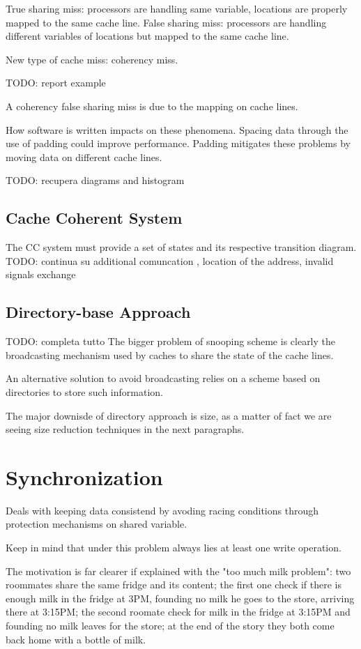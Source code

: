 True sharing miss: processors are handling same variable, locations are properly mapped to the same cache line.
False sharing miss: processors are handling different variables of locations but mapped to the same cache line.

New type of cache miss: coherency miss.

TODO: report example

A coherency false sharing miss is due to the mapping on cache lines.

How software is written impacts on these phenomena. Spacing data through the use of padding could improve performance. Padding mitigates these problems by moving data on different cache lines.

TODO: recupera diagrams and histogram

\subsection{Cache Coherent System}
The CC system must provide a set of states and its respective transition diagram. TODO: continua su additional comuncation , location of the address, invalid signals exchange

\subsection{Directory-base Approach}
TODO: completa tutto
The bigger problem of snooping scheme is clearly the broadcasting mechanism used by caches to share the state of the cache lines.

An alternative solution to avoid broadcasting relies on a scheme based on directories to store such information.

The major downisde of directory approach is size, as a matter of fact we are seeing size reduction techniques in the next paragraphs.

\section{Synchronization}
Deals with keeping data consistend by avoding racing conditions through protection mechanisms on shared variable.

Keep in mind that under this problem always lies at least one write operation.

The motivation is far clearer if explained with the "too much milk problem": two roommates share the same fridge and its content; the first one check if there is enough milk in the fridge at 3PM, founding no milk he goes to the store, arriving there at 3:15PM; the second roomate check for milk in the fridge at 3:15PM and founding no milk leaves for the store; at the end of the story they both come back home with a bottle of milk.

